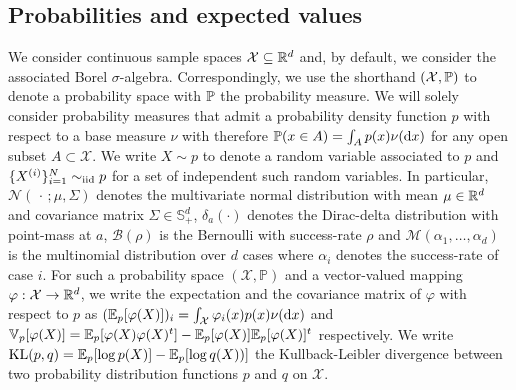 \subsection*{Probabilities and expected values}
We consider continuous sample spaces $\mathcal X\subseteq \R^{d}$ and, by default, we consider the associated Borel $\sigma$-algebra. 
Correspondingly, we use the shorthand $(\mathcal X,\P)$ to denote a probability space with $\P$ the probability measure. 
We will solely consider probability measures that admit a probability density function $p$ with respect to a base measure $\nu$ with therefore $\P(x\in A)=\int_{A}p(x)\nudx$ for any open subset $A\subset \mathcal X$. We write $X\sim p$ to denote a random variable associated to $p$ and $\{X^{(i)}\}_{i=1}^{N}\simiid p$ for a set of independent such random variables.
In particular, $\mathcal N(\,\cdot\,; \mu,\Sigma)$ denotes the multivariate normal distribution with mean $\mu\in \R^{d}$ and covariance matrix $\Sigma\in\mathbb S^{d}_+$, $\delta_a(\cdot)$ denotes the Dirac-delta distribution with point-mass at $a$, $\mathcal B(\rho)$ is the Bernoulli with success-rate $\rho$ and $\mathcal M(\alpha_{1},\dots,\alpha_{d})$ is the multinomial distribution over $d$ cases where $\alpha_{i}$ denotes the success-rate of case $i$.
For such a probability space $(\mathcal X, \mathbb P)$ and a vector-valued mapping $\varphi:\mathcal X\to\R^{d}$, we write the expectation and the covariance matrix of $\varphi$ with respect to $p$ as $(\E_{p}[\varphi(X)])_{i}=\int_{\mathcal X}\varphi_{i}(x)p(x)\nudx$ and $\V_{p}[\varphi(X)]=\E_{p}[\varphi(X)\varphi(X)^{t}]-\E_{p}[\varphi(X)]\E_{p}[\varphi(X)]^{t}$ respectively. 
We write $\KL{p,q}=\E_{p}[\log p(X)]-\E_{p}[\log q(X))]$ the Kullback-Leibler divergence between two probability distribution functions $p$ and $q$ on $\mathcal X$. 
%

